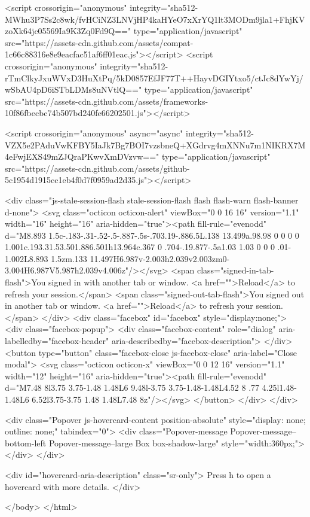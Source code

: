    <script crossorigin="anonymous" integrity="sha512-MWhu3P7Ss2c8wk/fvHCiNZ3LNVjHP4kaHYeO7xXrYQ1lt3MODm9jla1+FhjKVzoXk64jc05569Ia9K3Zq0Fd9Q==" type="application/javascript" src="https://assets-cdn.github.com/assets/compat-1c66c88316e8e9eacfac51af6ff01eac.js"></script>
    <script crossorigin="anonymous" integrity="sha512-rTmClkyJxuWVxD3HuXtPq/5kD0857EfJF77T++HayvDGIYtxo5/ctJc8dYwYj/wSbAU4pD6iSTbLDMs8uNVtlQ==" type="application/javascript" src="https://assets-cdn.github.com/assets/frameworks-10f86fbecbc74b507bd240fe66202501.js"></script>
    
    <script crossorigin="anonymous" async="async" integrity="sha512-VZX5e2PAduVwKFBY5IaJk7Bg7BOI7vzsbneQ+XGdrvg4mXNNu7m1NIKRX7M4eFwjEXS49mZJQraPKwvXmDVzvw==" type="application/javascript" src="https://assets-cdn.github.com/assets/github-5c1954d1915cc1eb4f0d7f0959ad2d35.js"></script>
    
    
    
  <div class="js-stale-session-flash stale-session-flash flash flash-warn flash-banner d-none">
    <svg class="octicon octicon-alert" viewBox="0 0 16 16" version="1.1" width="16" height="16" aria-hidden="true"><path fill-rule="evenodd" d="M8.893 1.5c-.183-.31-.52-.5-.887-.5s-.703.19-.886.5L.138 13.499a.98.98 0 0 0 0 1.001c.193.31.53.501.886.501h13.964c.367 0 .704-.19.877-.5a1.03 1.03 0 0 0 .01-1.002L8.893 1.5zm.133 11.497H6.987v-2.003h2.039v2.003zm0-3.004H6.987V5.987h2.039v4.006z"/></svg>
    <span class="signed-in-tab-flash">You signed in with another tab or window. <a href="">Reload</a> to refresh your session.</span>
    <span class="signed-out-tab-flash">You signed out in another tab or window. <a href="">Reload</a> to refresh your session.</span>
  </div>
  <div class="facebox" id="facebox" style="display:none;">
  <div class="facebox-popup">
    <div class="facebox-content" role="dialog" aria-labelledby="facebox-header" aria-describedby="facebox-description">
    </div>
    <button type="button" class="facebox-close js-facebox-close" aria-label="Close modal">
      <svg class="octicon octicon-x" viewBox="0 0 12 16" version="1.1" width="12" height="16" aria-hidden="true"><path fill-rule="evenodd" d="M7.48 8l3.75 3.75-1.48 1.48L6 9.48l-3.75 3.75-1.48-1.48L4.52 8 .77 4.25l1.48-1.48L6 6.52l3.75-3.75 1.48 1.48L7.48 8z"/></svg>
    </button>
  </div>
</div>

  <div class="Popover js-hovercard-content position-absolute" style="display: none; outline: none;" tabindex="0">
  <div class="Popover-message Popover-message--bottom-left Popover-message--large Box box-shadow-large" style="width:360px;">
  </div>
</div>

<div id="hovercard-aria-description" class="sr-only">
  Press h to open a hovercard with more details.
</div>


  </body>
</html>

